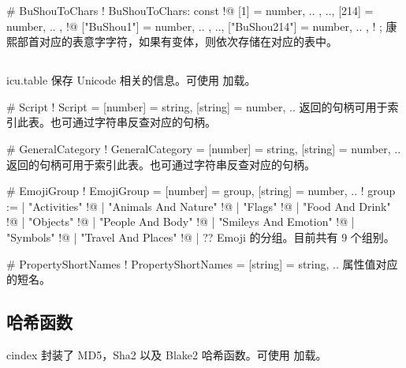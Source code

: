 \documentclass[class=article,doc={kv-usage}]{cusdoc}
\begin{document}
\begin{luadoc*}{}
# BuShouToChars
! BuShouToChars: const {
!@  [1] = { number, .. }, .., [214] = { number, .. },
!@  ["BuShou1"] = { number, .. }, .., ["BuShou214"] = { number, .. },
! };
康熙部首对应的表意字字符，如果有变体，则依次存储在对应的表中。
\end{luadoc*}


\subsection{}

\begin{luadoc}[global]{icu.table}
 保存 Unicode 相关的信息。可使用  加载。
\end{luadoc}

\begin{luadoc*}{}
# Script
! Script = { [number] = string, [string] = number, .. }
 返回的句柄可用于索引此表。也可通过字符串反查对应的句柄。
\end{luadoc*}

\begin{luadoc*}{}
# GeneralCategory
! GeneralCategory = { [number] = string, [string] = number, .. }
 返回的句柄可用于索引此表。也可通过字符串反查对应的句柄。
\end{luadoc*}

\begin{luadoc*}{}
# EmojiGroup
! EmojiGroup = { [number] = group, [string] = number, .. }
! group := | "Activities"
!@         | "Animals And Nature"
!@         | "Flags"
!@         | "Food And Drink"
!@         | "Objects"
!@         | "People And Body"
!@         | "Smileys And Emotion"
!@         | "Symbols"
!@         | "Travel And Places"
!@         | ??
Emoji 的分组。目前共有 9 个组别。
\end{luadoc*}

\begin{luadoc*}{}
# PropertyShortNames
! PropertyShortNames = { [string] = string, .. }
属性值对应的短名。
\end{luadoc*}


\subsection{ 哈希函数}

cindex 封装了 MD5，Sha2 以及 Blake2 哈希函数。可使用  加载。
\end{document}
